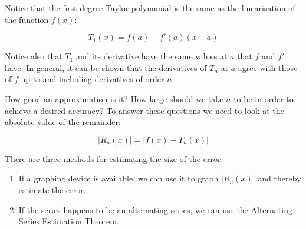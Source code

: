 \begin{paracol}{2}


Notice that the first-degree Taylor polynomial is the same as the linearisation of the function $f(x)$:

$$T_1(x) = f(a) + f'(a) (x - a)$$

Notice also that $T_1$ and its derivative have the same values at $a$ that $f$ and $f'$ have. In general, it can be shown that the derivatives of $T_n$ at $a$ agree with those of $f$ up to and including derivatives of order $n$.

\switchcolumn

How good an approximation is it? How large should we take $n$ to be in order to achieve a desired accuracy? To answer these questions we need to look at the absolute value of the remainder:

\vspace{-20pt}

$$| R_n(x) | = | f(x) - T_n(x) |$$

\vspace{-5pt}

There are three methods for estimating the size of the error:

\begin{enumerate}
    \item If a graphing device is available, we can use it to graph $| R_n(x) |$ and thereby estimate the error.

    \item If the series happens to be an alternating series, we can use the Alternating Series Estimation Theorem.


\end{enumerate}
\end{paracol}
